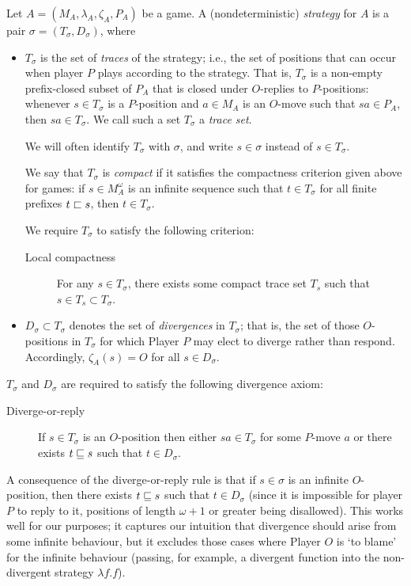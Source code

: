 \documentclass{article}
\begin{document}
\begin{definition}
  Let $A=(M_A,\lambda_A,\zeta_A,P_A)$ be a game.  A (nondeterministic) \emph{strategy} for $A$ is a pair $\sigma=(T_\sigma, D_\sigma)$, where
  \begin{itemize}
    \item $T_\sigma$ is the set of \emph{traces} of the strategy; i.e., the set of positions that can occur when player $P$ plays according to the strategy.  That is, $T_\sigma$ is a non-empty prefix-closed subset of $P_A$ that is closed under $O$-replies to $P$-positions: whenever $s\in T_\sigma$ is a $P$-position and $a\in M_A$ is an $O$-move such that $sa\in P_A$, then $sa\in T_\sigma$.  We call such a set $T_\sigma$ a \emph{trace set}.
      
      We will often identify $T_\sigma$ with $\sigma$, and write $s\in\sigma$ instead of $s\in T_\sigma$.

      We say that $T_\sigma$ is \emph{compact} if it satisfies the compactness criterion given above for games: if $s\in M_A^\omega$ is an infinite sequence such that $t\in T_\sigma$ for all finite prefixes $t\sqsubset s$, then $t\in T_\sigma$.  

      We require $T_\sigma$ to satisfy the following criterion:
      \begin{description}
        \item[Local compactness] For any $s\in T_\sigma$, there exists some compact trace set $T_s$ such that $s\in T_s\subset T_\sigma$.
      \end{description}

    \item $D_\sigma\subset T_\sigma$ denotes the set of \emph{divergences} in $T_\sigma$; that is, the set of those $O$-positions in $T_\sigma$ for which Player $P$ may elect to diverge rather than respond.  Accordingly, $\zeta_A(s)=O$ for all $s\in D_\sigma$.  
  \end{itemize}

  $T_\sigma$ and $D_\sigma$ are required to satisfy the following divergence axiom:
  \begin{description}
    \item[Diverge-or-reply] If $s\in T_\sigma$ is an $O$-position then either $sa\in T_\sigma$ for some $P$-move $a$ or there exists $t\sqsubseteq s$ such that $t\in D_\sigma$.  
  \end{description}

  A consequence of the diverge-or-reply rule is that if $s\in \sigma$ is an infinite $O$-position, then there exists $t\sqsubseteq s$ such that $t\in D_\sigma$ (since it is impossible for player $P$ to reply to it, positions of length $\omega+1$ or greater being disallowed).  This works well for our purposes; it captures our intuition that divergence should arise from some infinite behaviour, but it excludes those cases where Player $O$ is `to blame' for the infinite behaviour (passing, for example, a divergent function into the non-divergent strategy $\lambda f.f$).  
\end{definition}
\end{document}
